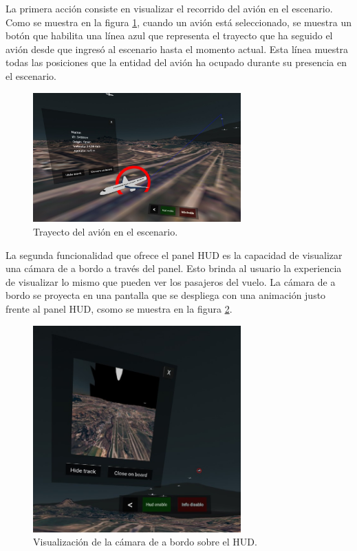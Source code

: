 \documentclass[a4paper, 11pt]{book}
\begin{document}
La primera acción consiste en visualizar el recorrido del avión en el escenario. Como se muestra en la figura \ref{fig:showTrack}, cuando un avión está seleccionado, se muestra un botón que habilita una línea azul que representa el trayecto que ha seguido el avión desde que ingresó al escenario hasta el momento actual. Esta línea muestra todas las posiciones que la entidad del avión ha ocupado durante su presencia en el escenario.
\begin{figure}[h]
  \centering
  \includegraphics[width=8cm, keepaspectratio]{img/show_track.jpg}
  \caption{Trayecto del avión en el escenario.}
  \label{fig:showTrack}
\end{figure}
La segunda funcionalidad que ofrece el panel HUD es la capacidad de visualizar una cámara de a bordo a través del panel. Esto brinda al usuario la experiencia de visualizar lo mismo que pueden ver los pasajeros del vuelo. La cámara de a bordo se proyecta en una pantalla que se despliega con una animación justo frente al panel HUD, csomo se muestra en la figura \ref{fig:cameraOnBoard}.
\begin{figure}[h]
  \centering
  \includegraphics[width=8cm, keepaspectratio]{img/cameraOnBoard.jpg}
  \caption{Visualización de la cámara de a bordo sobre el HUD.}
  \label{fig:cameraOnBoard}
\end{figure}
\end{document}
